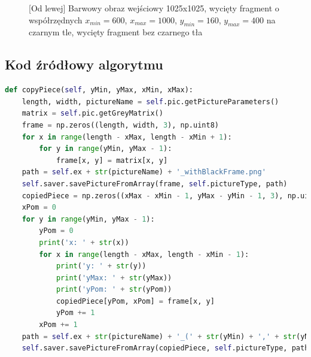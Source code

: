 \documentclass[a4paper,12pt, titlepage]{report}
\begin{document}
\begin{figure}[h]
    \centering
    \caption{[Od lewej] Barwowy obraz wejściowy 1025x1025, wycięty fragment o współrzędnych \(x_{min}=600\), \(x_{max}=1000\), \(y_{min}=160\), \(y_{max}=400\) na czarnym tle, wycięty fragment bez czarnego tła}%
    \label{fig:rysunek}%
\end{figure}
\FloatBarrier
\subsection*{Kod źródłowy algorytmu}
\begin{lstlisting}[language=Python]
def copyPiece(self, yMin, yMax, xMin, xMax):
    length, width, pictureName = self.pic.getPictureParameters()
    matrix = self.pic.getGreyMatrix()
    frame = np.zeros((length, width, 3), np.uint8)
    for x in range(length - xMax, length - xMin + 1):
        for y in range(yMin, yMax - 1):
            frame[x, y] = matrix[x, y]
    path = self.ex + str(pictureName) + '_withBlackFrame.png'
    self.saver.savePictureFromArray(frame, self.pictureType, path)
    copiedPiece = np.zeros((xMax - xMin - 1, yMax - yMin - 1, 3), np.uint8)
    xPom = 0
    for y in range(yMin, yMax - 1):
        yPom = 0
        print('x: ' + str(x))
        for x in range(length - xMax, length - xMin - 1):
            print('y: ' + str(y))
            print('yMax: ' + str(yMax))
            print('yPom: ' + str(yPom))
            copiedPiece[yPom, xPom] = frame[x, y]
            yPom += 1
        xPom += 1
    path = self.ex + str(pictureName) + '_(' + str(yMin) + ',' + str(yMax) + '),(' + str(xMin) + ',' + str(xMax) + ').png'
    self.saver.savePictureFromArray(copiedPiece, self.pictureType, path)
\end{lstlisting}
\end{document}
